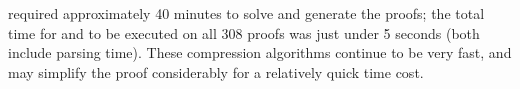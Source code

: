 
{\SPASS} required approximately 40 minutes to solve and generate the proofs; the total time for {\GFOLU} and {\FORPI} to be executed on all 308 proofs was just under 5 seconds (both include parsing time). These compression algorithms continue to be very fast, and may simplify the proof considerably for a relatively quick time cost.

\begin{figure}[bt]
\centering

\end{figure}
